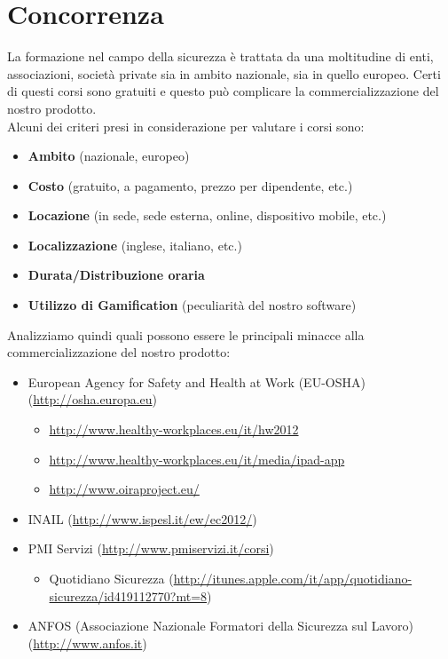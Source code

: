 \section{Concorrenza}

La formazione nel campo della sicurezza è trattata da una moltitudine di enti, associazioni, società private sia in ambito nazionale, sia in quello europeo. Certi di questi corsi sono gratuiti e questo può complicare la
commercializzazione del nostro prodotto.\\

Alcuni dei criteri presi in considerazione per valutare i corsi sono:

\begin{itemize}
	\item \textbf{Ambito} (nazionale, europeo)
	\item \textbf{Costo} (gratuito, a pagamento, prezzo per dipendente, etc.)
	\item \textbf{Locazione} (in sede, sede esterna, online, dispositivo mobile, etc.)
	\item \textbf{Localizzazione} (inglese, italiano, etc.)
	\item \textbf{Durata/Distribuzione oraria}
	\item \textbf{Utilizzo di Gamification} (peculiarità del nostro software)
\end{itemize}

Analizziamo quindi quali possono essere le principali minacce alla commercializzazione del nostro prodotto:


\begin{itemize}
	\item European Agency for Safety and Health at Work (EU-OSHA) (\url{http://osha.europa.eu})
		\begin{itemize}
			\item \url{http://www.healthy-workplaces.eu/it/hw2012}
			\item \url{http://www.healthy-workplaces.eu/it/media/ipad-app}
			\item \url{http://www.oiraproject.eu/}
		\end{itemize}
	\item INAIL (\url{http://www.ispesl.it/ew/ec2012/})
	\item PMI Servizi (\url{http://www.pmiservizi.it/corsi})
		\begin{itemize}
			\item Quotidiano Sicurezza (\url{http://itunes.apple.com/it/app/quotidiano-sicurezza/id419112770?mt=8})
		\end{itemize}
	\item ANFOS (Associazione Nazionale Formatori della Sicurezza sul Lavoro) (\url{http://www.anfos.it})
\end{itemize}

